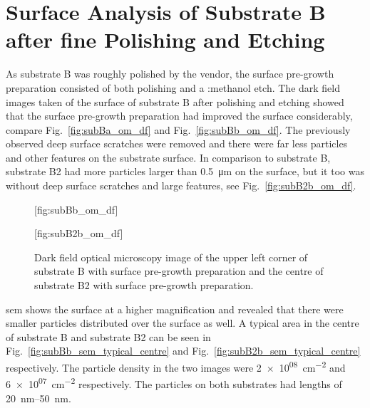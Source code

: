 \clearpage
   
\section{Surface Analysis of Substrate B after fine Polishing and Etching}

As substrate B was roughly polished by the vendor, the surface pre-growth preparation consisted of both polishing and a :methanol etch. The dark field images taken of the surface of substrate B after polishing and etching showed that the surface pre-growth preparation had improved the surface considerably, compare Fig.~\ref{fig:subBa_om_df} and Fig.~\ref{fig:subBb_om_df}. The previously observed deep surface scratches were removed and there were far less particles and other features on the substrate surface. In comparison to substrate B, substrate B2 had more particles larger than \SI{0.5}{\micro\metre} on the surface, but it too was without deep surface scratches and large features, see Fig.~\ref{fig:subB2b_om_df}.

\begin{figure}[htbp]
    \centering
    [fig:subBb_om_df]
    \par\bigskip
    [fig:subB2b_om_df]
    \caption[Dark field optical microscopy image of substrate B and B2 with surface pre-growth preparation.]{Dark field optical microscopy image of  the upper left corner of substrate B with surface pre-growth preparation and  the centre of substrate B2 with surface pre-growth preparation.}\label{fig:subBb_and_subB2b_om_df}
\end{figure}

\Ac{sem} shows the surface at a higher magnification and revealed that there were smaller particles distributed over the surface as well. A typical area in the centre of substrate B and substrate B2 can be seen in Fig.~\ref{fig:subBb_sem_typical_centre} and Fig.~\ref{fig:subB2b_sem_typical_centre} respectively. The particle density in the two images were \SI{2e+08}{\centi\metre^{-2}} and \SI{6e+07}{\centi\metre^{-2}} respectively. The particles on both substrates had lengths of \SIrange{20}{50}{\nano\metre}. 

